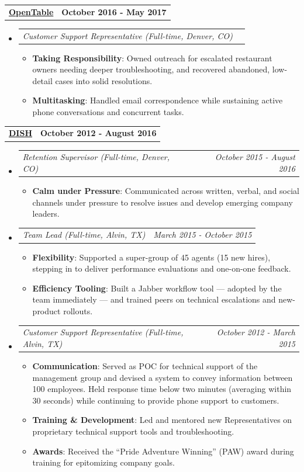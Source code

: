 \documentclass[letterpaper,10.8pt]{article}
\makeatletter
\newcommand{\resumeItem}[2]{
  \item\small{
    \textbf{#1}{: #2 \vspace{-2pt}}
  }
}
\newcommand{\jobLineItem}[2]{
  \vspace{0pt}\item[]
    \begin{tabular*}{0.98\textwidth}{l@{\extracolsep{\fill}}r}
      \textit{#1} & \textit{\small #2} \\
    \end{tabular*}\vspace{-4pt}
}
\newcommand{\employerTitle}[3]{
  \begin{tabular*}{1\textwidth}{l@{\extracolsep{\fill}}r}
    \href{#1}{\textbf{#2}} & \textbf{#3} \\
  \end{tabular*}\vspace{-4pt}
}
\newcommand{\resumeSubHeadingListStart}{\begin{itemize}[leftmargin=*]}
\newcommand{\resumeSubHeadingListEnd}{\end{itemize}}
\newcommand{\resumeItemListStart}{\begin{itemize}}
\newcommand{\resumeItemListEnd}{\end{itemize}\vspace{-5pt}}
\makeatother
\begin{document}
  \employerTitle
    {https://www.opentable.com}{OpenTable}{October 2016 - May 2017}
  \resumeSubHeadingListStart
    \jobLineItem
      {Customer Support Representative (Full-time, Denver, CO)}{}
      \resumeItemListStart
        \resumeItem{Taking Responsibility}{Owned outreach for escalated restaurant owners needing deeper troubleshooting, and recovered abandoned, low-detail cases into solid resolutions.}
        \resumeItem{Multitasking}{Handled email correspondence while sustaining active phone conversations and concurrent tasks.}
      \resumeItemListEnd
  \resumeSubHeadingListEnd

  \employerTitle
    {https://www.dish.com}{DISH}{October 2012 - August 2016}
  \resumeSubHeadingListStart
    \jobLineItem
      {Retention Supervisor (Full-time, Denver, CO)}{October 2015 - August 2016}
      \resumeItemListStart
        \resumeItem{Calm under Pressure}{Communicated across written, verbal, and social channels under pressure to resolve issues and develop emerging company leaders.}
      \resumeItemListEnd
    \jobLineItem
      {Team Lead (Full-time, Alvin, TX)}{March 2015 - October 2015}
      \resumeItemListStart
        \resumeItem{Flexibility}{Supported a super-group of 45 agents (15 new hires), stepping in to deliver performance evaluations and one-on-one feedback.}
        \resumeItem{Efficiency Tooling}{Built a Jabber workflow tool --- adopted by the team immediately --- and trained peers on technical escalations and new-product rollouts.}
      \resumeItemListEnd
    \jobLineItem
      {Customer Support Representative (Full-time, Alvin, TX)}{October 2012 - March 2015}
      \resumeItemListStart
        \resumeItem{Communication}{Served as POC for technical support of the management group and devised a system to convey information between 100 employees. Held response time below two minutes (averaging within 30 seconds) while continuing to provide phone support to customers.}
        \resumeItem{Training \& Development}{Led and mentored new Representatives on proprietary technical support tools and troubleshooting.}
        \resumeItem{Awards}{Received the ``Pride Adventure Winning'' (PAW) award during training for epitomizing company goals.}
      \resumeItemListEnd
  \resumeSubHeadingListEnd

\end{document}
